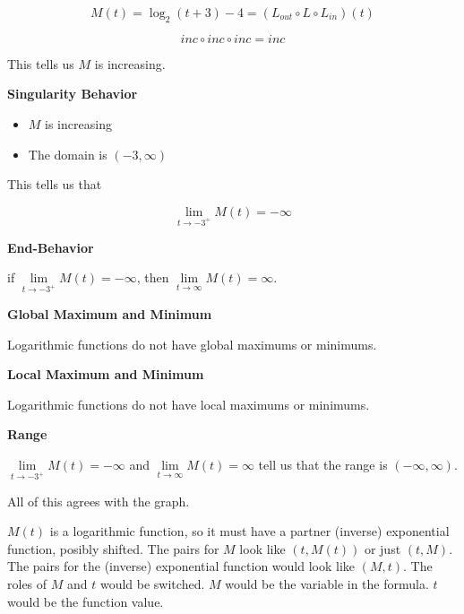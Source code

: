 \documentclass{ximera}
\begin{document}
\begin{example}
\[ M(t) = \log_2(t+3) - 4 = (L_{out} \circ L \circ L_{in})(t) \]  


\[ inc \circ inc \circ inc = inc \]


This tells us $M$ is increasing.





\textbf{Singularity Behavior}

\begin{itemize}
\item $M$ is increasing
\item The domain is $(-3, \infty)$
\end{itemize}


This tells us that

\[
\lim\limits_{t \to -3^+} M(t) = -\infty
\]





\textbf{End-Behavior}


if  $\lim\limits_{t \to -3^+} M(t) = -\infty$, then $\lim\limits_{t \to \infty} M(t) = \infty$. 





\textbf{Global Maximum and Minimum}

Logarithmic functions do not have global maximums or minimums. 






\textbf{Local Maximum and Minimum}

Logarithmic functions do not have local maximums or minimums. 




\textbf{Range}



$\lim\limits_{t \to -3^+} M(t) = -\infty$ and $\lim\limits_{t \to \infty} M(t) = \infty$ tell us that the range is $(-\infty, \infty)$. 


All of this agrees with the graph.


\end{example}



$M(t)$ is a logarithmic function, so it must have a partner (inverse) exponential function, posibly shifted.  The pairs for $M$ look like $(t, M(t))$ or just $(t,M)$. The pairs for the (inverse) exponential function would look like $(M, t)$.  The roles of $M$ and $t$ would be switched. $M$ would be the variable in the formula. $t$ would be the function value.
\end{document}
